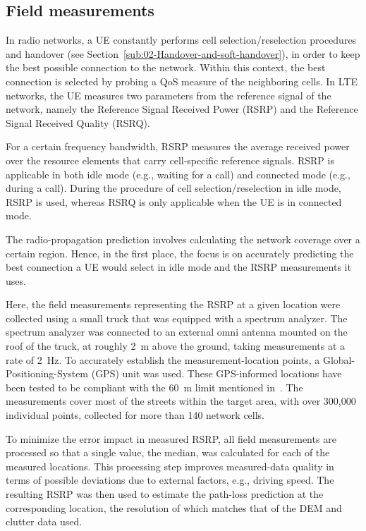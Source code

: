 \subsection{Field measurements \label{sub:05-Field_measurements}}

In radio networks, a UE constantly performs cell selection/reselection
procedures and handover (see Section~\ref{sub:02-Handover-and-soft-handover}),
in order to keep the best possible connection to the network. Within
this context, the best connection is selected by probing a QoS measure
of the neighboring cells. In LTE networks, the UE measures two parameters
from the reference signal of the network, namely the Reference Signal
Received Power (RSRP)
and the Reference Signal Received Quality (RSRQ).

For a certain frequency bandwidth, RSRP measures the average received
power over the resource elements that carry cell-specific reference
signals. RSRP is applicable in both idle mode (e.g., waiting for a
call) and connected mode (e.g., during a call). During the procedure
of cell selection/reselection in idle mode, RSRP is used, whereas
RSRQ is only applicable when the UE is in connected mode. 

The radio-propagation prediction involves calculating the network
coverage over a certain region. Hence, in the first place, the focus
is on accurately predicting the best connection a UE would select
in idle mode and the RSRP measurements it uses.

Here, the field measurements representing the RSRP at a given location
were collected using a small truck that was equipped with a spectrum
analyzer. The spectrum analyzer was connected to an external omni
antenna mounted on the roof of the truck, at roughly 2~m above the
ground, taking measurements at a rate of 2~Hz. To accurately establish
the measurement-location points, a Global-Positioning-System (GPS)
unit was used. These GPS-informed locations have been tested to be
compliant with the 60~m limit mentioned in~\cite{Aarnaes-Tuning_of_empirical_radio_propagation_models_effect_of_location_accuracy:2004}.
The measurements cover most of the streets within the target area,
with over 300,000 individual points, collected for more than 140 network
cells.

To minimize the error impact in measured RSRP, all field measurements
are processed so that a single value, the median, was calculated for
each of the measured locations. This processing step improves measured-data
quality in terms of possible deviations due to external factors, e.g.,
driving speed. The resulting RSRP was then used to estimate the path-loss
prediction at the corresponding location, the resolution of which
matches that of the DEM and clutter data used.


